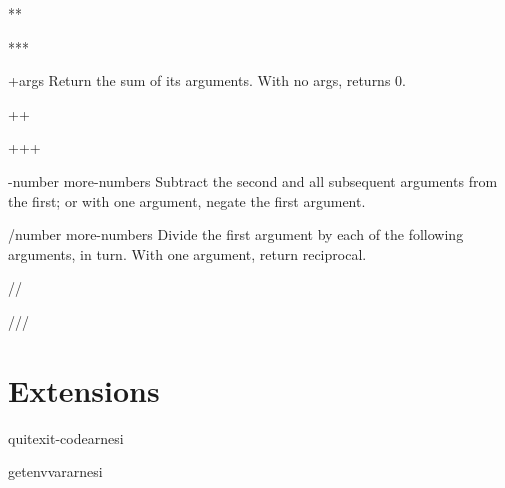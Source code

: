 \begin{variable}{**}{}{}{}
  
\end{variable}

\begin{variable}{***}{}{}{}
  
\end{variable}

\begin{variable}{+}{\rest args}{}{}
  Return the sum of its arguments. With no args, returns 0.
\end{variable}

\begin{variable}{++}{}{}{}
  
\end{variable}

\begin{variable}{+++}{}{}{}
  
\end{variable}

\begin{variable}{-}{number \rest more-numbers}{}{}
  Subtract the second and all subsequent arguments from the first;
  or with one argument, negate the first argument.
\end{variable}

\begin{variable}{/}{number \rest more-numbers}{}{}
  Divide the first argument by each of the following arguments, in turn.
  With one argument, return reciprocal.
\end{variable}

\begin{variable}{//}{}{}{}
  
\end{variable}

\begin{variable}{///}{}{}{}
  
\end{variable}

\section{Extensions}
\label{sec:extensions}

\begin{function}{quit}{\op exit-code}{arnesi}{}
  
\end{function}

\begin{function}{getenv}{var}{arnesi}{}
  
\end{function}

